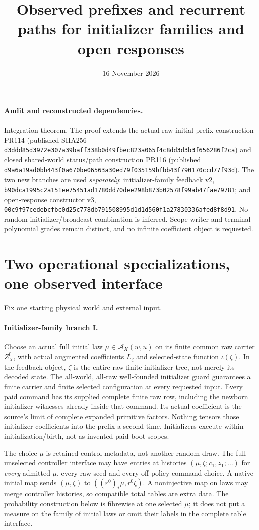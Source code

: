 \documentclass[11pt]{article}
\title{Observed prefixes and recurrent paths for initializer families and open responses}
\date{16 November 2026}
\begin{document}
\maketitle
\paragraph{Audit and reconstructed dependencies.}
Integration theorem. The proof extends the actual raw-initial prefix construction PR114 (published SHA256 \texttt{d3ddd85d3972e307a39baff338b0d49fbec823a065f4c8dd3d3b3f656286f2ca}) and closed shared-world status/path construction PR116 (published \texttt{d9a6a19ad0bb443f0a670be06563a30ed79f035159bfbb43f790170ccd77f93d}). The two new branches are used \emph{separately}: initializer-family feedback v2, \texttt{b90dca1995c2a151ee75451ad1780dd70dee298b873b02578f99ab47fae79781}; and open-response constructor v3, \texttt{00c9f97cedebcfbc0d25c778db791508995d1d1d560f1a27830336afed8f8d91}. No random-initializer/broadcast combination is inferred. Scope writer and terminal polynomial grades remain distinct, and no infinite coefficient object is requested.

\section{Two operational specializations, one observed interface}
Fix one starting physical world and external input.

\paragraph{Initializer-family branch I.}
Choose an actual full initial law $\mu\in\mathcal A_X(w,u)$ on its finite common raw carrier $Z_X^0$, with actual augmented coefficients $L_\zeta$ and selected-state function $\iota(\zeta)$. In the feedback object, $\zeta$ is the entire raw finite initializer tree, not merely its decoded state. The all-world, all-raw well-founded initializer guard guarantees a finite carrier and finite selected configuration at every requested input. Every paid command has its supplied complete finite raw row, including the newborn initializer witnesses already inside that command. Its actual coefficient is the source's limit of complete expanded primitive factors. Nothing tensors those initializer coefficients into the prefix a second time. Initializers execute within initialization/birth, not as invented paid boot scopes.

The choice $\mu$ is retained control metadata, not another random draw. The full unselected controller interface may have entries at histories $(\mu,\zeta;c_1,z_1;\ldots)$ for \emph{every} admitted $\mu$, every raw seed and every off-policy command choice. A native initial map sends $(\mu,\zeta)$ to $((r^0)_*\mu,r^0\zeta)$. A noninjective map on laws may merge controller histories, so compatible total tables are extra data. The probability construction below is fibrewise at one selected $\mu$; it does not put a measure on the family of initial laws or omit their labels in the complete table interface.
\end{document}
